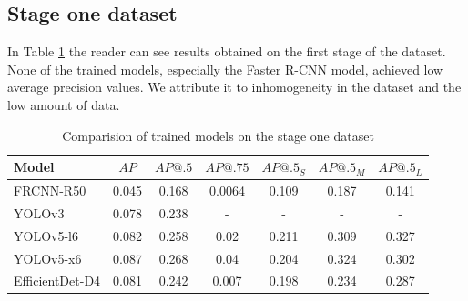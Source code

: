 \subsection{Stage one dataset}
In Table \ref{tab:model_results:stage_one} the reader can see results obtained on the first stage of the dataset. None of the trained models, especially the Faster R-CNN model, achieved low average precision values. We attribute it to inhomogeneity in the dataset and the low amount of data.
\begin{table}[H]
    \centering
    \begin{tabular}{|l|c|c|c|c|c|c|}
        \hline
        Model           & $AP$  & $AP@.5$ & $AP@.75$ & $AP@.5_S$ & $AP@.5_M$ & $AP@.5_L$ \\ \hline
        FRCNN-R50       & 0.045 & 0.168   & 0.0064   & 0.109     & 0.187     & 0.141     \\ \hline
        YOLOv3          & 0.078 & 0.238   & -        & -         & -         & -         \\ \hline
        YOLOv5-l6       & 0.082 & 0.258   & 0.02     & 0.211     & 0.309     & 0.327     \\ \hline
        YOLOv5-x6       & 0.087 & 0.268   & 0.04     & 0.204     & 0.324     & 0.302     \\ \hline
        EfficientDet-D4 & 0.081 & 0.242   & 0.007    & 0.198     & 0.234     & 0.287     \\ \hline
    \end{tabular}
    \caption{Comparision of trained models on the stage one dataset}
    \label{tab:model_results:stage_one}
\end{table}

